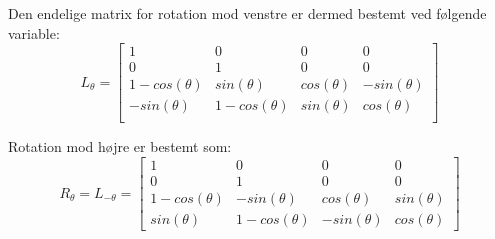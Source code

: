 \documentclass[a4paper,12pt]{article}
\begin{document}
Den endelige matrix for rotation mod venstre er dermed bestemt ved følgende variable:\\
\[
L_\theta
=
\left[\begin{array}{cccc}
    1 & 0 & 0 & 0\\
    0 & 1 & 0 & 0\\
    1 - cos(\theta) & sin(\theta) & cos(\theta) &  -sin(\theta)\\
    -sin(\theta) & 1 - cos(\theta) & sin(\theta) & cos(\theta)\\
\end{array}\right]
\]


Rotation mod højre er bestemt som:\\

\[
R_\theta = L_{-\theta}=
\left[\begin{array}{cccc}
    1 & 0 & 0 & 0 \\
    0 & 1 & 0 & 0 \\
    1 - cos(\theta) & -sin(\theta) & cos(\theta) &  sin(\theta)\\
    sin(\theta) & 1 - cos(\theta) & -sin(\theta) & cos(\theta)
\end{array}\right]
\]
\end{document}
